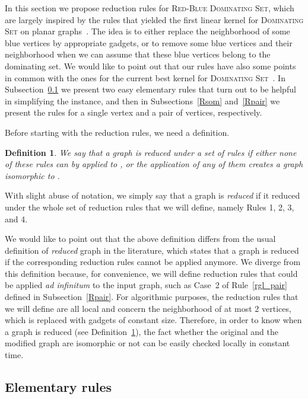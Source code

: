 \documentclass[a4paper,11pt]{article}
\newtheorem{defi} {Definition}
\newcommand{\domrb}  [0] {\textsc{Red-Blue Dominating Set}\xspace}
\newcommand{\dom}    [0] {\textsc{Dominating Set}\xspace}
\begin{document}
In this section we propose reduction rules for \domrb, which are largely inspired by the rules that yielded the first linear kernel for \dom on planar graphs~\cite{AFN04}. The idea is to either replace the neighborhood of some blue vertices by appropriate gadgets, or to remove some blue vertices and their neighborhood when we can assume that these blue vertices belong to the dominating set. We would like to point out that our rules have also some points in common with the ones for the current best kernel for \dom~\cite{CFKX07}. In Subsection~\ref{elementary} we present two easy elementary rules that turn out to be helpful in simplifying the instance, and then in Subsections~\ref{Rsom} and~\ref{Rpair} we present the rules for a single vertex and a pair of vertices, respectively.





Before starting with the reduction rules, we need a definition.

\begin{defi}\label{def:reduce}
We say that a graph  is \emph{reduced under a set of rules} if either none of these rules can by applied to , or the application of any of them creates a graph isomorphic to .
\end{defi}

With slight abuse of notation, we simply say that a graph is \emph{reduced} if it reduced under the whole set of reduction rules that we will define, namely Rules 1, 2, 3, and 4.

We would like to point out that the above definition differs from the usual definition of \emph{reduced} graph in the literature, which states that a graph is reduced if the corresponding reduction rules cannot be applied anymore. We diverge from this definition because, for convenience, we will define reduction rules  that could be applied {\sl ad infinitum} to the input graph, such as Case~2 of Rule~\ref{rgl_pair} defined in Subsection~\ref{Rpair}. For algorithmic purposes, the reduction rules that we will define are all local and concern the neighborhood of at most 2 vertices, which is replaced with gadgets of constant size. Therefore, in order to know when a graph is reduced (see Definition~\ref{def:reduce}), the fact whether the original and the modified graph are isomorphic or not  can be easily checked locally in constant time.


\subsection{Elementary rules} \label{elementary}
\end{document}
